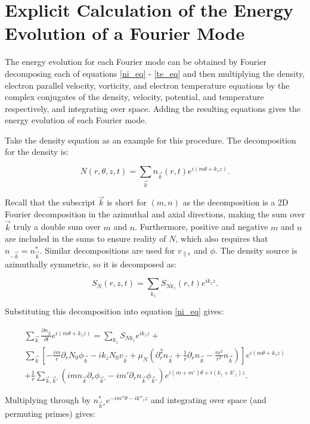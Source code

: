 \documentclass[showpacs,preprintnumbers,amsmath,amssymb,superscriptaddress]{revtex4}
\def\beq{\begin{equation}}
\def\eeq{\end{equation}}
\def\beqar{\begin{eqnarray}}
\def\eeqar{\end{eqnarray}}
\newcommand{\pdiff}[2]{\frac{\partial#1}{\partial#2}}
\newcommand{\pdr}{\partial_r}
\newcommand{\pdrr}{\partial^2_r}
\newcommand{\vpe}{v_{\parallel e}}
\begin{document}
\appendix

\section{Explicit Calculation of the Energy Evolution of a Fourier Mode}

The energy evolution for each Fourier mode can be obtained by Fourier decomposing each of equations \ref{ni_eq} - \ref{te_eq}
and then multiplying the density, electron parallel velocity, vorticity, and electron temperature equations by the complex conjugates of the 
density, velocity, potential, and temperature respectively, and integrating over space.
Adding the resulting equations gives the energy evolution of each Fourier mode.

Take the density equation as an example for this procedure. The decomposition for the density is:

\beq
\label{density_decomp}
N(r,\theta,z,t) = \sum_{\vec{k}} n_{\vec{k}}(r,t) e^{i(m \theta + k_z z)}.
\eeq

Recall that the subscript $\vec{k}$ is short for $(m,n)$ as the decomposition is a 2D Fourier decomposition in the azimuthal and axial directions, making the sum over $\vec{k}$ truly
a double sum over $m$ and $n$. Furthermore, positive and negative
$m$ and $n$ are included in the sums to ensure reality of $N$, which also requires that $n_{-\vec{k}} = n_{\vec{k}}^*$.
Similar decompositions are used for $\vpe$ and $\phi$. The density source is azimuthally symmetric, so it is decomposed as:

\beq
\label{source_decomp}
S_N(r,z,t) = \sum_{k_z} S_{N k_z}(r,t) e^{i k_z z}.
\eeq

Substituting this decomposition into equation \ref{ni_eq} gives:

\beqar
\label{density_eq_fourier}
\sum_{\vec{k}} \pdiff{n_{\vec{k}}}{t} e^{i(m \theta + k_z z)} = \sum_{k_z} S_{N k_z} e^{i k_z z} + \nonumber \\
\sum_{\vec{k}} \left[ -\frac{i m}{r} \pdr N_0 \phi_{\vec{k}} - i k_z N_0 v_{\vec{k}} + \mu_N(\pdrr n_{\vec{k}} + \frac{1}{r} \pdr n_{\vec{k}} - \frac{m^2}{r^2} n_{\vec{k}}) \right] e^{i(m \theta + k_z z)} \nonumber \\
+ \frac{1}{r} \sum_{\vec{k},\vec{k}'} (i m n_{\vec{k}} \pdr \phi_{\vec{k}'} - i m' \pdr n_{\vec{k}} \phi_{\vec{k}'}) e^{i (m + m') \theta + i (k_z + k'_z) z}.
\eeqar

Multiplying through by $n_{\vec{k}''}^* e^{- i m'' \theta - i k''_z z}$ and integrating over space (and permuting primes) gives:
\end{document}
